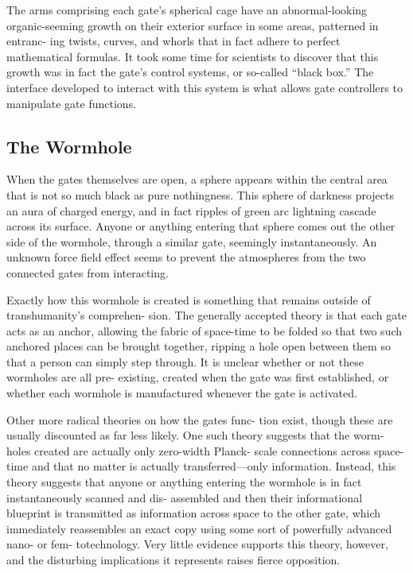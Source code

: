 The arms comprising each gate's spherical cage have 
an abnormal-looking organic-seeming growth on their 
exterior surface in some areas, patterned in entranc-
ing twists, curves, and whorls that in fact adhere to 
perfect mathematical formulas. It took some time for 
scientists to discover that this growth was in fact the 
gate's control systems, or so-called ``black box.'' The 
interface developed to interact with this system is what 
allows gate controllers to manipulate gate functions.

\subsection{The Wormhole}

When the gates themselves are open, a sphere appears 
within the central area that is not so much black as 
pure nothingness. This sphere of darkness projects an 
aura of charged energy, and in fact ripples of green 
arc lightning cascade across its surface. Anyone or 
anything entering that sphere comes out the other side 
of the wormhole, through a similar gate, seemingly 
instantaneously. An unknown force field effect seems 
to prevent the atmospheres from the two connected 
gates from interacting.

Exactly how this wormhole is created is something 
that remains outside of transhumanity's comprehen-
sion. The generally accepted theory is that each gate 
acts as an anchor, allowing the fabric of space-time 
to be folded so that two such anchored places can 
be brought together, ripping a hole open between 
them so that a person can simply step through. It is 
unclear whether or not these wormholes are all pre-
existing, created when the gate was first established, 
or whether each wormhole is manufactured whenever 
the gate is activated.

Other more radical theories on how the gates func-
tion exist, though these are usually discounted as far 
less likely. One such theory suggests that the worm-
holes created are actually only zero-width Planck-
scale connections across space-time and that no matter 
is actually transferred—only information. Instead, this 
theory suggests that anyone or anything entering the 
wormhole is in fact instantaneously scanned and dis-
assembled and then their informational blueprint is 
transmitted as information across space to the other 
gate, which immediately reassembles an exact copy 
using some sort of powerfully advanced nano- or fem-
totechnology. Very little evidence supports this theory, 
however, and the disturbing implications it represents 
raises fierce opposition.

